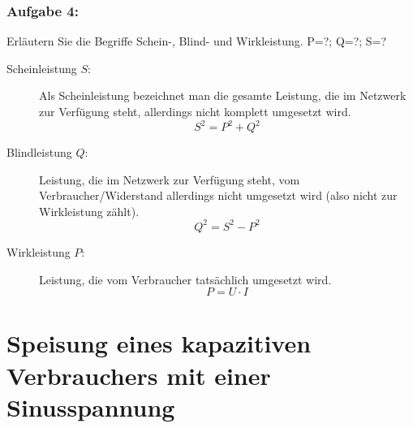 \documentclass[11pt,a4paper,titlepage]{scrreprt}
\begin{document}
                \subsubsection{Aufgabe 4:}   Erläutern Sie die Begriffe Schein-, Blind- und Wirkleistung.   P=?; Q=?; S=?
                     \begin{description}
                         \item[Scheinleistung $S$:] Als Scheinleistung bezeichnet man die gesamte Leistung, die im Netzwerk zur Verfügung steht, allerdings nicht komplett umgesetzt wird.
                         \begin{equation*}
                         S^2= P^2 + Q^2
                         \end{equation*}
                         \item[Blindleistung $Q$:] Leistung, die im Netzwerk zur Verfügung steht, vom Verbraucher/Widerstand allerdings nicht umgesetzt wird (also nicht zur Wirkleistung zählt).
                         \begin{equation*}
                         Q^2 =S^2-P^2
                         \end{equation*}
                         \item[Wirkleistung $P$:] Leistung, die vom Verbraucher tatsächlich umgesetzt wird.
                         \begin{equation*}
                         P = U \cdot I
                         \end{equation*}
                     \end{description}
                         
                         
                
                 
        \section{Speisung eines kapazitiven Verbrauchers mit einer Sinusspannung}
\end{document}
